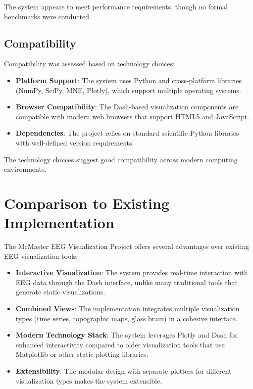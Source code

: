 \documentclass[12pt, titlepage]{article}
\begin{document}
The system appears to meet performance requirements, though no formal benchmarks were conducted.

\subsection{Compatibility}
Compatibility was assessed based on technology choices:

\begin{itemize}
    \item \textbf{Platform Support}: The system uses Python and cross-platform libraries (NumPy, SciPy, MNE, Plotly), which support multiple operating systems.
    
    \item \textbf{Browser Compatibility}: The Dash-based visualization components are compatible with modern web browsers that support HTML5 and JavaScript.
    
    \item \textbf{Dependencies}: The project relies on standard scientific Python libraries with well-defined version requirements.
\end{itemize}

The technology choices suggest good compatibility across modern computing environments.

\section{Comparison to Existing Implementation}	

The McMaster EEG Visualization Project offers several advantages over existing EEG visualization tools:

\begin{itemize}
    \item \textbf{Interactive Visualization}: The system provides real-time interaction with EEG data through the Dash interface, unlike many traditional tools that generate static visualizations.
    
    \item \textbf{Combined Views}: The implementation integrates multiple visualization types (time series, topographic maps, glass brain) in a cohesive interface.
    
    \item \textbf{Modern Technology Stack}: The system leverages Plotly and Dash for enhanced interactivity compared to older visualization tools that use Matplotlib or other static plotting libraries.
    
    \item \textbf{Extensibility}: The modular design with separate plotters for different visualization types makes the system extensible.
\end{itemize}
\end{document}
